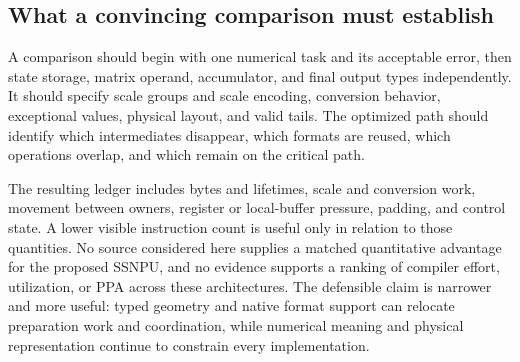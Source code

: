 \subsection{What a convincing comparison must establish}

A comparison should begin with one numerical task and its acceptable error, then state storage, matrix operand, accumulator, and final output types independently. It should specify scale groups and scale encoding, conversion behavior, exceptional values, physical layout, and valid tails. The optimized path should identify which intermediates disappear, which formats are reused, which operations overlap, and which remain on the critical path.

The resulting ledger includes bytes and lifetimes, scale and conversion work, movement between owners, register or local-buffer pressure, padding, and control state. A lower visible instruction count is useful only in relation to those quantities. No source considered here supplies a matched quantitative advantage for the proposed SSNPU, and no evidence supports a ranking of compiler effort, utilization, or PPA across these architectures. The defensible claim is narrower and more useful: typed geometry and native format support can relocate preparation work and coordination, while numerical meaning and physical representation continue to constrain every implementation.
